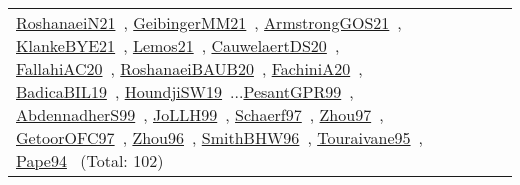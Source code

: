 {\begin{longtable}{p{3cm}r>{\raggedright\arraybackslash}p{6cm}>{\raggedright\arraybackslash}p{6cm}>{\raggedright\arraybackslash}p{8cm}}
\href{../works/RoshanaeiN21.pdf}{RoshanaeiN21}~\cite{RoshanaeiN21}, \href{../works/GeibingerMM21.pdf}{GeibingerMM21}~\cite{GeibingerMM21}, \href{../works/ArmstrongGOS21.pdf}{ArmstrongGOS21}~\cite{ArmstrongGOS21}, \href{../works/KlankeBYE21.pdf}{KlankeBYE21}~\cite{KlankeBYE21}, \href{../works/Lemos21.pdf}{Lemos21}~\cite{Lemos21}, \href{../works/CauwelaertDS20.pdf}{CauwelaertDS20}~\cite{CauwelaertDS20}, \href{../works/FallahiAC20.pdf}{FallahiAC20}~\cite{FallahiAC20}, \href{../works/RoshanaeiBAUB20.pdf}{RoshanaeiBAUB20}~\cite{RoshanaeiBAUB20}, \href{../works/FachiniA20.pdf}{FachiniA20}~\cite{FachiniA20}, \href{../works/BadicaBIL19.pdf}{BadicaBIL19}~\cite{BadicaBIL19}, \href{../works/HoundjiSW19.pdf}{HoundjiSW19}~\cite{HoundjiSW19}...\href{../works/PesantGPR99.pdf}{PesantGPR99}~\cite{PesantGPR99}, \href{../works/AbdennadherS99.pdf}{AbdennadherS99}~\cite{AbdennadherS99}, \href{../works/JoLLH99.pdf}{JoLLH99}~\cite{JoLLH99}, \href{../works/Schaerf97.pdf}{Schaerf97}~\cite{Schaerf97}, \href{../works/Zhou97.pdf}{Zhou97}~\cite{Zhou97}, \href{../works/GetoorOFC97.pdf}{GetoorOFC97}~\cite{GetoorOFC97}, \href{../works/Zhou96.pdf}{Zhou96}~\cite{Zhou96}, \href{../works/SmithBHW96.pdf}{SmithBHW96}~\cite{SmithBHW96}, \href{../works/Touraivane95.pdf}{Touraivane95}~\cite{Touraivane95}, \href{../works/Pape94.pdf}{Pape94}~\cite{Pape94} (Total: 102)\\

\end{longtable}}
